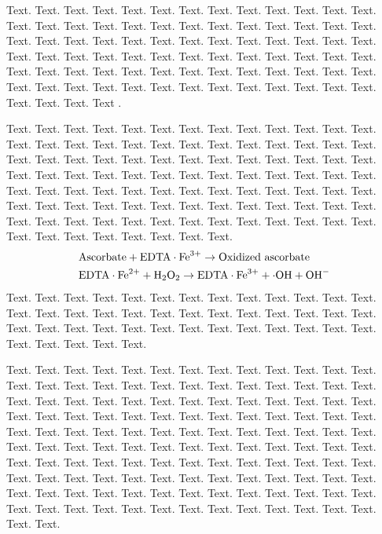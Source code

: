 \documentclass[a4,center,fleqn]{NAR}
\begin{document}
Text. Text. Text. Text. Text. Text. Text. Text. Text. Text. Text.
Text. Text. Text. Text. Text. Text. Text. Text. Text. Text. Text.
Text. Text. Text. Text. Text. Text. Text. Text. Text. Text. Text.
Text. Text. Text. Text. Text. Text. Text. Text. Text. Text. Text.
Text. Text. Text. Text. Text. Text. Text. Text. Text. Text. Text.
Text. Text. Text. Text. Text. Text. Text. Text. Text. Text. Text.
Text. Text. Text. Text. Text. Text. Text. Text. Text. Text. Text.
Text. Text. Text{}. Text.
Text \cite{1}.

Text. Text. Text. Text. Text. Text. Text. Text. Text. Text. Text.
Text. Text. Text. Text. Text. Text. Text. Text. Text. Text. Text.
Text. Text. Text. Text. Text. Text. Text. Text. Text. Text. Text.
Text. Text. Text. Text. Text. Text. Text. Text. Text. Text. Text.
Text. Text. Text. Text. Text. Text. Text. Text. Text. Text. Text.
Text. Text. Text. Text. Text. Text. Text. Text. Text. Text. Text.
Text. Text. Text. Text. Text. Text. Text. Text. Text. Text. Text.
Text. Text. Text. Text. Text. Text. Text. Text. Text. Text. Text.
Text. Text. Text. Text. Text. Text. Text. Text. Text. Text. Text.
\begin{align*}
&\mathrm{Ascorbate} + \mathrm{EDTA} \cdot \mathrm{Fe}^{3+} \to
\hbox{Oxidized ascorbate}
\\
&\mathrm{EDTA} \cdot \mathrm{Fe}^{2+} + \mathrm{H}_2
\mathrm{O}_2 \to
\mathrm{EDTA} \cdot \mathrm{Fe}^{3+} + \cdot
\mathrm{OH} + \mathrm{OH}^-
\end{align*}
Text. Text. Text. Text. Text. Text. Text. Text. Text. Text. Text.
Text. Text. Text. Text. Text. Text. Text. Text. Text. Text. Text.
Text. Text. Text. Text. Text. Text. Text. Text. Text. Text. Text.
Text. Text. Text. Text. Text. Text. Text. Text. Text. Text. Text.

Text. Text. Text. Text. Text. Text. Text. Text. Text. Text. Text.
Text. Text. Text. Text. Text. Text. Text. Text. Text. Text. Text.
Text. Text. Text. Text. Text. Text. Text. Text. Text. Text. Text.
Text. Text. Text. Text. Text. Text. Text. Text. Text. Text. Text.
Text. Text. Text. Text. Text. Text. Text. Text. Text. Text. Text.
Text. Text. Text. Text. Text. Text. Text. Text. Text. Text. Text.
Text. Text. Text. Text. Text. Text. Text. Text. Text. Text. Text.
Text. Text. Text. Text. Text. Text. Text. Text. Text. Text. Text.
Text. Text. Text. Text. Text. Text. Text. Text. Text. Text. Text.
Text. Text. Text. Text. Text. Text. Text. Text. Text. Text. Text.
Text. Text. Text. Text. Text. Text. Text. Text. Text. Text. Text.
Text. Text. Text. Text. Text. Text. Text. Text. Text. Text. Text.
\enlargethispage{-65.1pt}
\end{document}
